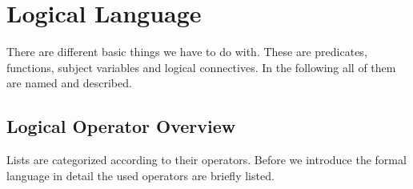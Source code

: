 \documentclass[a4paper,german,10pt,twoside]{book}
\theoremstyle{definition}
\theoremstyle{remark}
\begin{document}

\chapter{Logical Language} \label{chapter3} \hypertarget{chapter3}{}

There are different basic things we have to do with. These are predicates, functions, subject variables and logical connectives. In the following all of them are named and described.

\section{Logical Operator Overview} \label{chapter3_section1} \hypertarget{chapter3_section1}{}
Lists are categorized according to their operators. 
Before we introduce the formal language in detail the used operators are briefly listed. 
\end{document}
